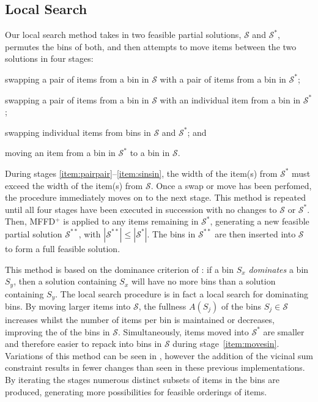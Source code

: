 \documentclass[authoryear]{elsarticle}
\begin{document}
\subsection{Local Search}
\label{sub:localsearch}
\noindent Our local search method takes in two feasible partial solutions, $\mathcal{S}$ and $\mathcal{S}^*$, permutes the bins of both, and then attempts to move items between the two solutions in four stages: 
\begin{enumerate*}[label={(\roman*)}]
	\item swapping a pair of items from a bin in $\mathcal{S}$ with a pair of items from a bin in $\mathcal{S}^*$;\label{item:pairpair}
	\item swapping a pair of items from a bin in $\mathcal{S}$ with an individual item from a bin in $\mathcal{S}^*$;\label{item:pairsin}
	\item swapping individual items from bins in $\mathcal{S}$ and $\mathcal{S}^*$;\label{item:sinsin} and
	\item moving an item from a bin in $\mathcal{S}^*$ to a bin in $\mathcal{S}$.\label{item:movesin}
\end{enumerate*} 
During stages \ref{item:pairpair}--\ref{item:sinsin}, the width of the item(s) from $\mathcal{S}^*$ must exceed the width of the item(s) from $\mathcal{S}$. Once a swap or move has been perfomed, the procedure immediately moves on to the next stage. This method is repeated until all four stages have been executed in succession with no changes to $\mathcal{S}$ or $\mathcal{S}^*$. Then, MFFD$^+$ is applied to any items remaining in $\mathcal{S}^*$, generating a new feasible partial solution $\mathcal{S}^{**}$, with $|\mathcal{S}^{**}| \leq |\mathcal{S}^*|$. The bins in $\mathcal{S}^{**}$ are then inserted into $\mathcal{S}$ to form a full feasible solution.

This method is based on the dominance criterion of \citet{martello1990l}: if a bin $S_x$ \emph{dominates} a bin $S_y$, then a solution containing $S_x$ will have no more bins than a solution containing $S_y$. The local search procedure is in fact a local search for dominating bins. By moving larger items into $\mathcal{S}$, the fullness $A(S_j)$ of the bins $S_j \in \mathcal{S}$ increases whilst the number of items per bin is maintained or decreases, improving the  of the bins in $\mathcal{S}$. Simultaneously, items moved into $\mathcal{S}^*$ are smaller and therefore easier to repack into bins in $\mathcal{S}$ during stage~\ref{item:movesin}. Variations of this method can be seen in \citet{lewis2009, lewis2017, falkenauer1996, levine2004}, however the addition of the vicinal sum constraint results in fewer changes than seen in these previous implementations. By iterating the stages numerous distinct subsets of items in the bins are produced, generating more possibilities for feasible orderings of items.
\end{document}

